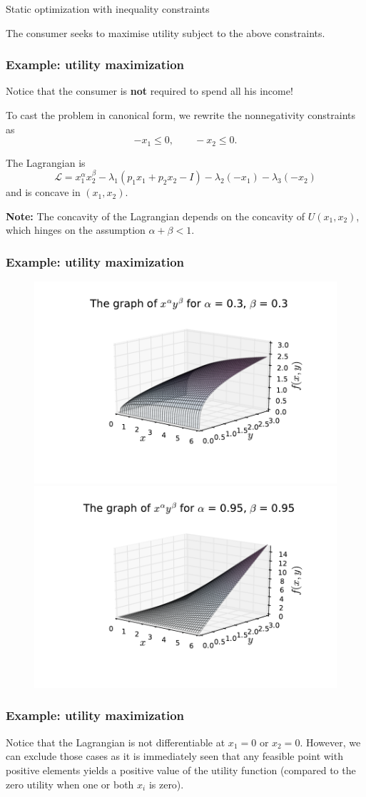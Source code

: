 \documentclass[10pt]{beamer}
\theoremstyle{definition}
\begin{document}
\begin{section}{Static optimization with inequality constraints}
\begin{frame}[fragile]
The consumer seeks to maximise utility subject to the above constraints.
\end{frame}

\begin{frame}[fragile]
\frametitle{Example: utility maximization}
Notice that the consumer is \textbf{not} required to spend all his income!\bigskip

To cast the problem in canonical form, we rewrite the nonnegativity constraints as
\[ -x_1\leq 0 , \qquad -x_2 \leq 0. \] \bigskip

The Lagrangian is \[ \mathcal{L} = x_1^\alpha x_2^\beta - \lambda_1 ( p_1 x_1 + p_2 x_2 - I) -\lambda_2 (-x_1) - \lambda_3 (-x_2) \] and is {\color{red}concave} in $ (x_1,x_2) $.\bigskip


\textbf{Note: }The concavity of the Lagrangian depends on the concavity of $ U(x_1,x_2) $, which hinges on the assumption $ \alpha+\beta < 1 $.
\end{frame}

\begin{frame}[fragile]
\frametitle{Example: utility maximization}
\begin{figure}
\centering
\includegraphics[width=0.5\linewidth]{ConcF}
\includegraphics[width=0.5\linewidth]{NonConcF}
\end{figure}
\end{frame}

\begin{frame}[fragile]
\frametitle{Example: utility maximization}
Notice that the Lagrangian is not differentiable at $ x_1=0 $ or $ x_2=0 $. However, we can exclude those cases as it is immediately seen that any feasible point with positive elements yields a positive value of the utility function (compared to the zero utility when one or both $ x_i $ is zero).\bigskip


\end{frame}
\end{section}
\end{document}
